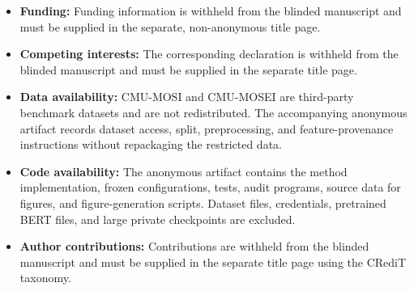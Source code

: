 \documentclass[pdflatex,Numbered,sn-basic]{sn-jnl}
\begin{document}
\begin{itemize}
\item \textbf{Funding:} Funding information is withheld from the blinded
manuscript and must be supplied in the separate, non-anonymous title page.
\item \textbf{Competing interests:} The corresponding declaration is withheld
from the blinded manuscript and must be supplied in the separate title page.
\item \textbf{Data availability:} CMU-MOSI and CMU-MOSEI are third-party
benchmark datasets and are not redistributed. The accompanying anonymous
artifact records dataset access, split, preprocessing, and feature-provenance
instructions without repackaging the restricted data.
\item \textbf{Code availability:} The anonymous artifact contains the method
implementation, frozen configurations, tests, audit programs, source data for
figures, and figure-generation scripts. Dataset files, credentials, pretrained
BERT files, and large private checkpoints are excluded.
\item \textbf{Author contributions:} Contributions are withheld from the
blinded manuscript and must be supplied in the separate title page using the
CRediT taxonomy.
\end{itemize}


\end{document}
